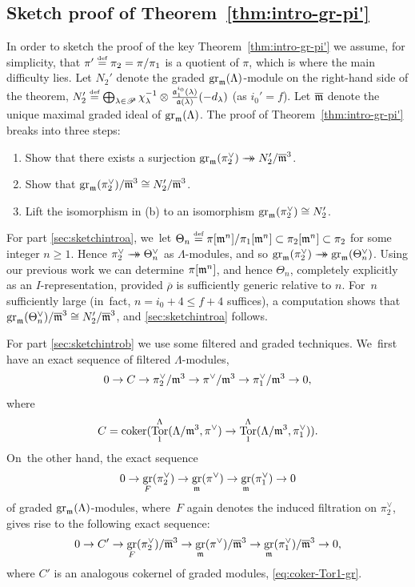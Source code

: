 \documentclass[JEP,XML,SOM,Unicode,NoFloatCountersInSection, NoEqCountersInSection,published]{cedram}
\newenvironment{enumeratea}
{\bgroup\def\theenumi{\alph{enumi}}\begin{enumerate}}
{\end{enumerate}\egroup}
\newcommand{\onto}{\mathchoice{\to\hspace*{-5mm}\to}{\mathrel{\hbox{$\to\hspace*{-2.85mm}\to$}}}{\to\hspace*{-3mm}\to}{\to\hspace*{-3mm}\to}}
\let\ovl\overline
\renewcommand{\theenumi}{\roman{enumi}}
\newcommand{\defeq}{\stackrel{\textrm{\tiny{\upshape{def}}}}{=}}
\newcommand{\fa}{\mathfrak{a}}
\newcommand{\brho}{\overline{\rho}}
\DeclareMathOperator{\coker}{coker}
\DeclareMathOperator{\gr}{gr}
\DeclareMathOperator{\Tor}{Tor}
\theoremstyle{plain}
\theoremstyle{definition}
\begin{document}
\subsection{Sketch proof of Theorem~\ref{thm:intro-gr-pi'}}\label{sec:sketchintro}

In order to sketch the proof of the key Theorem~\ref{thm:intro-gr-pi'} we assume, for simplicity, that $\pi' \defeq \pi_2 = \pi/\pi_1$ is a quotient of $\pi$, which is where the main difficulty lies.
Let $N_2'$ denote the graded $\gr_\m(\Lambda)$-module on the right-hand side of the theorem, \ie $N_2' \defeq \bigoplus_{\lambda\in\mathscr{P}}\chi_{\lambda}^{-1}\otimes \frac{\fa_1^{i_0}(\lambda)}{\fa(\lambda)}(-d_\lambda)$ (as $i_0' = f$).
Let $\ovl\m$ denote the unique maximal graded ideal of $\gr_\m(\Lambda)$.
The proof of Theorem~\ref{thm:intro-gr-pi'} breaks into three steps:
\begin{enumeratea}
\item\label{sec:sketchintroa} Show that there exists a surjection $\gr_\m(\pi_2^\vee) \onto N_2'/\ovl\m^3$.
\item\label{sec:sketchintrob} Show that $\gr_\m(\pi_2^\vee)/\ovl\m^3 \cong N_2'/\ovl\m^3$.
\item\label{sec:sketchintroc} Lift the isomorphism in (b) to an isomorphism $\gr_\m(\pi_2^\vee) \cong N_2'$.
\end{enumeratea}

For part \eqref{sec:sketchintroa}, we~let $\Theta_n \defeq \pi[\m^n]/\pi_1[\m^n] \subset \pi_2[\m^n] \subset \pi_2$ for some integer $n \ge 1$.
Hence $\pi_2^\vee \onto \Theta_n^\vee$ as $\Lambda$-modules, and so $\gr_\m(\pi_2^\vee) \onto \gr_\m(\Theta_n^\vee)$. Using our previous work \cite[Lem.\,2.4.2]{BHHMS4} we can determine $\pi[\mathfrak{m}^n]$, and hence $\Theta_n$, completely explicitly as an $I$-representation, provided $\brho$ is sufficiently generic relative to $n$.
For~$n$ sufficiently large (in~fact, $n = i_0+4 \le f+4$ suffices), a computation shows that $\gr_\m(\Theta_n^\vee)/\ovl\m^3 \cong N_2'/\ovl\m^3$, and \eqref{sec:sketchintroa} follows.

For part \eqref{sec:sketchintrob} we use some filtered and graded techniques. We~first have an exact sequence of filtered $\Lambda$-modules,
\begin{equation}\label{eq:1st-seq}
0 \to C \to \pi_2^\vee/\mathfrak{m}^3 \to \pi^\vee/\mathfrak{m}^3 \to \pi_1^\vee/\mathfrak{m}^3 \to 0,
\end{equation}
where
\[
C = \coker(\Tor_1^\Lambda(\Lambda/\m^3,\pi^\vee) \to \Tor_1^\Lambda(\Lambda/\m^3,\pi_1^\vee)).
\]
On~the other hand, the exact sequence\vspace*{-3pt}
\[
0 \to \gr_{F}(\pi_2^\vee) \to \gr_{\m}(\pi^\vee) \to \gr_{\m}(\pi_1^\vee) \to 0
\]
of graded $\gr_\m(\Lambda)$-modules, where~$F$ again denotes the induced filtration on $\pi_2^\vee$,
gives rise to the following exact sequence:\vspace*{-3pt}
\begin{equation}\label{eq:2nd-seq}
0 \to C' \to \gr_{F}(\pi_2^\vee)/\ovl\m^3 \to \gr_{\m}(\pi^\vee)/\ovl\m^3 \to \gr_{\m}(\pi_1^\vee)/\ovl\m^3 \to 0,
\end{equation}
where $C'$ is an analogous cokernel of graded modules, \cf \eqref{eq:coker-Tor1-gr}.
\end{document}
